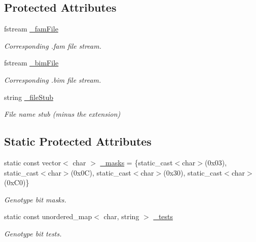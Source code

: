 \subsection*{Protected Attributes}
\begin{DoxyCompactItemize}
\item 
\mbox{\label{classsamp_files_1_1_bed_file_a4ff2286fc39ccc3eaa57f70d27d6947a}} 
fstream \hyperlink{classsamp_files_1_1_bed_file_a4ff2286fc39ccc3eaa57f70d27d6947a}{\+\_\+fam\+File}
\begin{DoxyCompactList}\small\item\em Corresponding .fam file stream. \end{DoxyCompactList}\item 
\mbox{\label{classsamp_files_1_1_bed_file_aa7b6f84a9bf506e239dbbbf1c03ce13a}} 
fstream \hyperlink{classsamp_files_1_1_bed_file_aa7b6f84a9bf506e239dbbbf1c03ce13a}{\+\_\+bim\+File}
\begin{DoxyCompactList}\small\item\em Corresponding .bim file stream. \end{DoxyCompactList}\item 
\mbox{\label{classsamp_files_1_1_bed_file_a2d2ec10c5653c4bd957351a8ff5226be}} 
string \hyperlink{classsamp_files_1_1_bed_file_a2d2ec10c5653c4bd957351a8ff5226be}{\+\_\+file\+Stub}
\begin{DoxyCompactList}\small\item\em File name stub (minus the extension) \end{DoxyCompactList}\end{DoxyCompactItemize}
\subsection*{Static Protected Attributes}
\begin{DoxyCompactItemize}
\item 
static const vector$<$ char $>$ \hyperlink{classsamp_files_1_1_bed_file_a26fc3857dd112e96e626da1a48b026bc}{\+\_\+masks} = \{static\+\_\+cast$<$char$>$(0x03), static\+\_\+cast$<$char$>$(0x0\+C), static\+\_\+cast$<$char$>$(0x30), static\+\_\+cast$<$char$>$(0x\+C0)\}
\begin{DoxyCompactList}\small\item\em Genotype bit masks. \end{DoxyCompactList}\item 
static const unordered\+\_\+map$<$ char, string $>$ \hyperlink{classsamp_files_1_1_bed_file_a153af12f613ef8cdea6297e124b92de7}{\+\_\+tests}
\begin{DoxyCompactList}\small\item\em Genotype bit tests. \end{DoxyCompactList}\end{DoxyCompactItemize}
